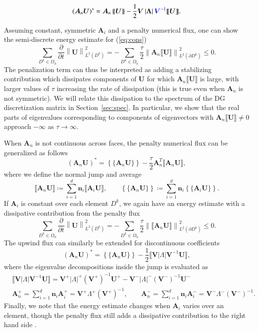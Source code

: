 \documentclass[preprint,10pt]{elsarticle}
\newcommand{\pd}[2]{\frac{\partial#1}{\partial#2}}
\newcommand{\nor}[1]{\left\| #1 \right\|}
\newcommand{\LRp}[1]{\left( #1 \right)}
\newcommand{\LRb}[1]{\left| #1 \right|}
\newcommand{\LRc}[1]{\left\{ #1 \right\}}
\newcommand{\jump}[1] {\ensuremath{\llbracket#1\rrbracket}}
\newcommand{\avg}[1] {\ensuremath{\LRc{\!\{#1\}\!}}}
\newcommand{\Oh}{\Omega_h}
\newcommand{\note}[1]{{\color{blue}#1}}
\begin{document}
\[
(\bm{A}_n\bm{U})^* = \bm{A}_n\avg{\bm{U}} - \frac{1}{2}\bm{V}\LRb{\bm{\Lambda}}\note{\bm{V}^{-1}} \jump{\bm{U}}.  
\]
\note{
Assuming constant, symmetric $\bm{A}_i$ and a penalty numerical flux, one can show the semi-discrete energy estimate \cite{hesthaven2007nodal, warburton2013low, kopriva2014energy, chan2016weight1} for (\ref{eq:cons})
\[
\sum_{D^k\in \Oh}\pd{}{t}\nor{\bm{U}}^2_{L^2\LRp{D^k}} = -\sum_{D^k \in \Oh} \frac{\tau}{2}\nor{\bm{A}_n\jump{\bm{U}}}^2_{L^2\LRp{\partial D^k}} \leq 0.
\]
The penalization term can thus be interpreted as adding a stabilizing contribution which dissipates components of $\bm{U}$ for which $\bm{A}_n\jump{\bm{U}}$ is large, with larger values of $\tau$ increasing the rate of dissipation (this is true even when $\bm{A}_n$ is not symmetric).  We will relate this dissipation to the spectrum of the DG discretization matrix in Section~\ref{sec:spec}.  In particular, we show that the real parts of eigenvalues corresponding to components of eigenvectors with $\bm{A}_n\jump{\bm{U}}\neq 0$ approach $-\infty$ as $\tau \rightarrow \infty$.  

When $\bm{A}_n$ is not continuous across faces, the penalty numerical flux can be generalized as follows \cite{ye2016discontinuous}
\[
(\bm{A}_n\bm{U})^* = \avg{\bm{A}_n\bm{U}} - \frac{\tau}{2} \bm{A}_n^T \jump{\bm{A}_n\bm{U}},
\]
where we define the normal jump and average
\[
\jump{\bm{A}_n\bm{U}}\coloneqq \sum_{i=1}^d\bm{n}_i \jump{ \bm{A}_i \bm{U}}, \qquad \avg{\bm{A}_n\bm{U}} \coloneqq \sum_{i=1}^d\bm{n}_i\avg{ \bm{A}_i \bm{U}}.
\]
If $\bm{A}_i$ is constant over each element $D^k$, we again have an energy estimate with a dissipative contribution from the penalty flux
\[
\sum_{D^k\in \Oh}\pd{}{t}\nor{\bm{U}}^2_{L^2\LRp{D^k}} = -\sum_{D^k \in \Oh} \frac{\tau}{2}\nor{\jump{\bm{A}_n\bm{U}}}^2_{L^2\LRp{\partial D^k}} \leq 0.
\]
The upwind flux can similarly be extended for discontinuous coefficients
\[
(\bm{A}_n\bm{U})^* = \avg{\bm{A}_n\bm{U}} - \frac{1}{2} \jump{\bm{V}\LRb{\Lambda}\bm{V}^{-1}\bm{U}},
\]
where the eigenvalue decompositions inside the jump is evaluated as 
\begin{align*}
&\jump{\bm{V}\LRb{\Lambda}\bm{V}^{-1}\bm{U}} = {\bm{V}^+\LRb{\Lambda}^+\LRp{\bm{V}^+}^{-1}\bm{U}^+} - {\bm{V}^-\LRb{\Lambda}^-\LRp{\bm{V}^-}^{-1}\bm{U}^-}\\
&\bm{A}_n^+ = \sum_{i=1}^d \bm{n}_i \bm{A}_i^+ = \bm{V}^+{\Lambda}^+\LRp{\bm{V}^+}^{-1}, \qquad \bm{A}_n^- = \sum_{i=1}^d \bm{n}_i \bm{A}_i^- = \bm{V}^-{\Lambda}^-\LRp{\bm{V}^-}^{-1}.
\end{align*} 
Finally, we note that the energy estimate changes when $\bm{A}_i$ varies over an element, though the penalty flux still adds a dissipative contribution to the right hand side \cite{kopriva2014energy}.  
}
\end{document}
